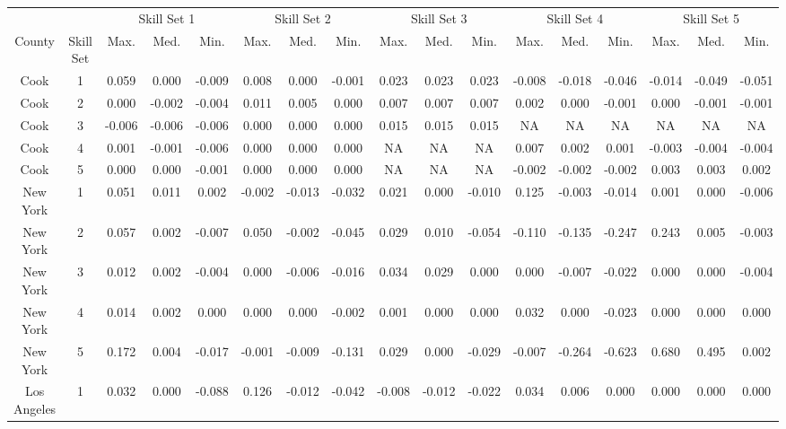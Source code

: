 
\centering
\begin{tabular}[t]{ccccccccccccccccc}
\toprule
\multicolumn{1}{c}{ } & \multicolumn{1}{c}{ } & \multicolumn{3}{c}{Skill Set 1} & \multicolumn{3}{c}{Skill Set 2} & \multicolumn{3}{c}{Skill Set 3} & \multicolumn{3}{c}{Skill Set 4} & \multicolumn{3}{c}{Skill Set 5} \\
\cmidrule(l{3pt}r{3pt}){3-5} \cmidrule(l{3pt}r{3pt}){6-8} \cmidrule(l{3pt}r{3pt}){9-11} \cmidrule(l{3pt}r{3pt}){12-14} \cmidrule(l{3pt}r{3pt}){15-17}
County & Skill Set & Max. & Med. & Min. & Max. & Med. & Min. & Max. & Med. & Min. & Max. & Med. & Min. & Max. & Med. & Min.\\
\midrule
Cook & 1 & 0.059 & 0.000 & -0.009 & 0.008 & 0.000 & -0.001 & 0.023 & 0.023 & 0.023 & -0.008 & -0.018 & -0.046 & -0.014 & -0.049 & -0.051\\
Cook & 2 & 0.000 & -0.002 & -0.004 & 0.011 & 0.005 & 0.000 & 0.007 & 0.007 & 0.007 & 0.002 & 0.000 & -0.001 & 0.000 & -0.001 & -0.001\\
Cook & 3 & -0.006 & -0.006 & -0.006 & 0.000 & 0.000 & 0.000 & 0.015 & 0.015 & 0.015 & NA & NA & NA & NA & NA & NA\\
Cook & 4 & 0.001 & -0.001 & -0.006 & 0.000 & 0.000 & 0.000 & NA & NA & NA & 0.007 & 0.002 & 0.001 & -0.003 & -0.004 & -0.004\\
Cook & 5 & 0.000 & 0.000 & -0.001 & 0.000 & 0.000 & 0.000 & NA & NA & NA & -0.002 & -0.002 & -0.002 & 0.003 & 0.003 & 0.002\\
New York & 1 & 0.051 & 0.011 & 0.002 & -0.002 & -0.013 & -0.032 & 0.021 & 0.000 & -0.010 & 0.125 & -0.003 & -0.014 & 0.001 & 0.000 & -0.006\\
New York & 2 & 0.057 & 0.002 & -0.007 & 0.050 & -0.002 & -0.045 & 0.029 & 0.010 & -0.054 & -0.110 & -0.135 & -0.247 & 0.243 & 0.005 & -0.003\\
New York & 3 & 0.012 & 0.002 & -0.004 & 0.000 & -0.006 & -0.016 & 0.034 & 0.029 & 0.000 & 0.000 & -0.007 & -0.022 & 0.000 & 0.000 & -0.004\\
New York & 4 & 0.014 & 0.002 & 0.000 & 0.000 & 0.000 & -0.002 & 0.001 & 0.000 & 0.000 & 0.032 & 0.000 & -0.023 & 0.000 & 0.000 & 0.000\\
New York & 5 & 0.172 & 0.004 & -0.017 & -0.001 & -0.009 & -0.131 & 0.029 & 0.000 & -0.029 & -0.007 & -0.264 & -0.623 & 0.680 & 0.495 & 0.002\\
Los Angeles & 1 & 0.032 & 0.000 & -0.088 & 0.126 & -0.012 & -0.042 & -0.008 & -0.012 & -0.022 & 0.034 & 0.006 & 0.000 & 0.000 & 0.000 & 0.000\\

\end{tabular}
